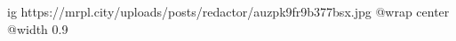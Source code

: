  
 
 
 
 

\ifcmt
  ig https://mrpl.city/uploads/posts/redactor/auzpk9fr9b377bsx.jpg
  @wrap center
  @width 0.9
\fi
